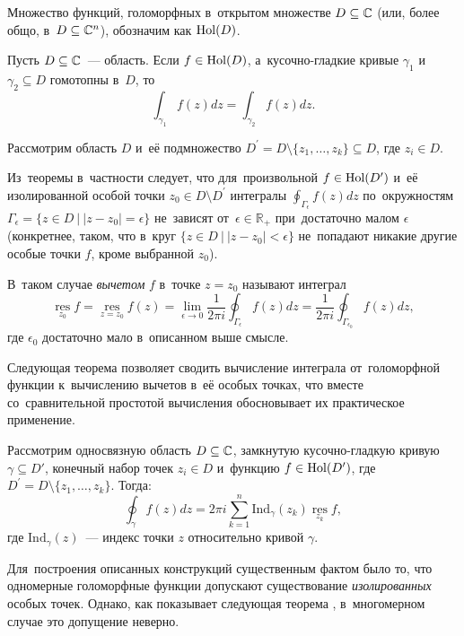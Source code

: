 \documentclass[a4paper,oneside]{article}
\newcommand{\notewrap}[1]{(#1)}
\begin{document}
Множество функций, голоморфных в~открытом множестве $D \subseteq \mathbb{C}$ (или, более общо, в~$D \subseteq \mathbb{C}^n$), обозначим как $\mathrm{Hol}(D)$.

\begin{theorem*}
  Пусть $D \subseteq \mathbb{C}$~— область. Если $f \in \mathrm{Hol}(D)$, а~кусочно-гладкие кривые $\gamma_1$
  и~$\gamma_2 \subseteq D$ гомотопны в~$D$, то
  \[
    \int_{\gamma_1} f(z)dz = \int_{\gamma_2} f(z)dz.
  \]
\end{theorem*}

Рассмотрим область $D$ и~её подмножество $D^\prime = D \setminus \{ z_1, \ldots, z_k \} \subseteq D$, где $z_i \in D$.

Из~теоремы в~частности следует, что для~произвольной $f \in \mathrm{Hol}(D^\prime)$ и~её изолированной
особой точки $z_0 \in D \setminus D^\prime$ интегралы $\oint_{\Gamma_\epsilon} f(z)dz$ по~окружностям
$\Gamma_\epsilon = \{ z \in D \ | \ |z - z_0| = \epsilon \}$ не~зависят от~$\epsilon \in \mathbb{R}_{+}$
при~достаточно малом $\epsilon$ (конкретнее, таком, что в~круг $\{ z \in D \ | \ |z - z_0| < \epsilon \}$
не~попадают никакие другие особые точки $f$, кроме выбранной $z_0$).

В~таком случае \textit{вычетом} $f$ в~точке $z = z_0$ называют интеграл
\[
  \operatorname*{res}\limits_{z_0} f = \operatorname*{res}\limits_{z = z_0} f(z) = \lim\limits_{\epsilon \to 0} \frac{1}{2 \pi i} \oint_{\Gamma_\epsilon} f(z)dz = \frac{1}{2 \pi i} \oint_{\Gamma_{\epsilon_0}} f(z)dz,
\]
где $\epsilon_0$ достаточно мало в~описанном выше смысле.

Следующая теорема позволяет сводить вычисление интеграла от~голоморфной функции к~вычислению вычетов в~её особых точках,
что вместе со~сравнительной простотой вычисления обосновывает их практическое применение.
\begin{theorem*}[\notewrap{основная о вычетах}]
  Рассмотрим односвязную область $D \subseteq \mathbb{C}$, замкнутую кусочно-гладкую кривую $\gamma \subseteq D'$,
  конечный набор точек $z_i \in D$ и~функцию $f \in \mathrm{Hol}(D^\prime)$, где $D^\prime = D \setminus \{ z_1, \ldots, z_k \}$.
  Тогда:
  \[
    \oint_{\gamma} f(z)dz = 2 \pi i \sum_{k = 1}^{n} \mathrm{Ind}_{\gamma}(z_k) \operatorname*{res}\limits_{z_k} f,
  \]
  где $\mathrm{Ind}_{\gamma}(z)$~— индекс точки $z$ относительно кривой $\gamma$.
\end{theorem*}

Для~построения описанных конструкций существенным фактом было то, что одномерные голоморфные функции допускают
существование \textit{изолированных} особых точек. Однако, как показывает следующая теорема \cite{ShaII}, в~многомерном случае
это допущение неверно.
\end{document}
